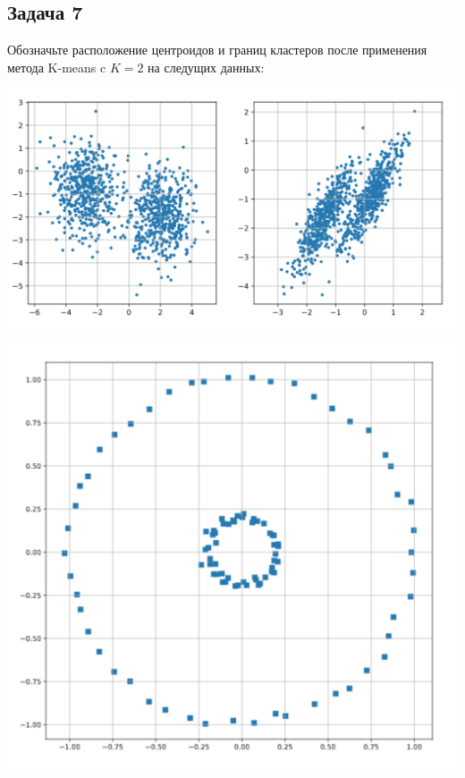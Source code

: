 \documentclass[12pt, a4paper, oneside]{article}
\begin{document}
\subsection*{Задача 7} 

Обозначьте расположение центроидов и границ кластеров после применения метода K-means c $K=2$ на следущих данных: 

\begin{minipage}[t]{0.66\textwidth}
	\begin{center}
		\includegraphics[scale=0.15]{clouds.png}
	\end{center}
\end{minipage}
\begin{minipage}[t]{0.33\textwidth}
	\begin{center}
		\includegraphics[scale=0.13]{circles.png}
	\end{center}
\end{minipage}
\end{document}
